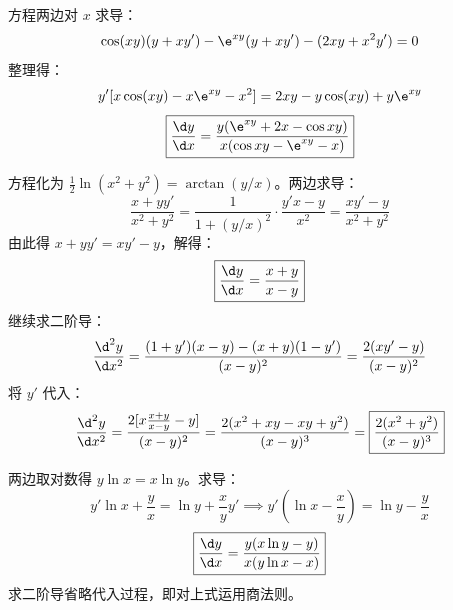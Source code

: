 \begin{solution}
    方程两边对 $x$ 求导：
    \begin{equation}
        \cos(xy)(y + x y') - \e^{xy}(y + x y') - (2xy + x^2 y') = 0
    \end{equation}
    整理得：
    \begin{equation}
        y' [x \cos(xy) - x \e^{xy} - x^2] = 2xy - y \cos(xy) + y \e^{xy}
    \end{equation}
    \begin{equation}
        \boxed{\frac{\d y}{\d x} = \frac{y(\e^{xy} + 2x - \cos xy)}{x(\cos xy - \e^{xy} - x)}}
    \end{equation}

    方程化为 $\frac{1}{2} \ln(x^2 + y^2) = \arctan(y/x)$。两边求导：
    \begin{equation}
        \frac{x + y y'}{x^2 + y^2} = \frac{1}{1 + (y/x)^2} \cdot \frac{y' x - y}{x^2} = \frac{x y' - y}{x^2 + y^2}
    \end{equation}
    由此得 $x + y y' = x y' - y$，解得：
    \begin{equation}
        \boxed{\frac{\d y}{\d x} = \frac{x + y}{x - y}}
    \end{equation}
    继续求二阶导：
    \begin{equation}
        \frac{\d^2 y}{\d x^2} = \frac{(1 + y')(x - y) - (x + y)(1 - y')}{(x - y)^2} = \frac{2(x y' - y)}{(x - y)^2}
    \end{equation}
    将 $y'$ 代入：
    \begin{equation}
        \frac{\d^2 y}{\d x^2} = \frac{2 [x \frac{x+y}{x-y} - y]}{(x - y)^2} = \frac{2(x^2 + xy - xy + y^2)}{(x - y)^3} = \boxed{\frac{2(x^2 + y^2)}{(x - y)^3}}
    \end{equation}

    两边取对数得 $y \ln x = x \ln y$。求导：
    \begin{equation}
        y' \ln x + \frac{y}{x} = \ln y + \frac{x}{y} y' \implies y' \left(\ln x - \frac{x}{y}\right) = \ln y - \frac{y}{x}
    \end{equation}
    \begin{equation}
        \boxed{\frac{\d y}{\d x} = \frac{y(x \ln y - y)}{x(y \ln x - x)}}
    \end{equation}
    求二阶导省略代入过程，即对上式运用商法则。


\end{solution}
